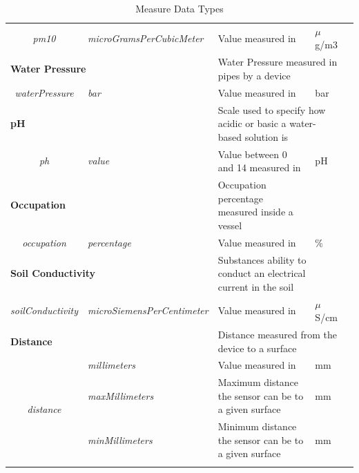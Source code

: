 \begin{landscape}
\begin{longtable}{cllll}
   \textit{pm10}                         & \textit{microGramsPerCubicMeter}   & Value measured in                                      & $\mu$g/m3                      &  \\ \cline{1-4}
   \multicolumn{2}{l}{\textbf{Water Pressure}}                                & \multicolumn{2}{l}{Water Pressure measured in pipes by a device}                        &  \\
   \textit{waterPressure}                & \textit{bar}                       & Value measured in                                      & bar                            &  \\ \cline{1-4}
   \multicolumn{2}{l}{\textbf{pH}}                                            & \multicolumn{2}{l}{Scale used to specify how acidic or basic a water-based solution is} &  \\
   \textit{ph}                           & \textit{value}                     & Value between 0 and 14 measured in                     & pH                             &  \\ \cline{1-4}
   \multicolumn{2}{l}{\textbf{Occupation}}                                    & Occupation percentage measured inside a vessel         &                                &  \\
   \textit{occupation}                   & \textit{percentage}                & Value measured in                                      & \%                             &  \\ \cline{1-4}
   \multicolumn{2}{l}{\textbf{Soil Conductivity}}                             & \multicolumn{2}{l}{Substances ability to conduct an electrical current in the soil}     &  \\
   \textit{soilConductivity}             & \textit{microSiemensPerCentimeter} & Value measured in                                      & $\mu$S/cm                      &  \\ \cline{1-4}
   \multicolumn{2}{l}{\textbf{Distance}}                                      & \multicolumn{2}{l}{Distance measured from the device to a surface}                      &  \\
   \multirow{3}{*}{\textit{distance}}    & \textit{millimeters}               & Value measured in                                      & mm                             &  \\
                                         & \textit{maxMillimeters}            & Maximum distance the sensor can be to a given surface  & mm                             &  \\
                                         & \textit{minMillimeters}            & Minimum distance the sensor can be to a given surface  & mm                             &  \\ \cline{1-4}
   \caption{Measure Data Types}
   \label{tab:design:domain:shared_model:data:data_types}\\
   \end{longtable}
\end{landscape}

